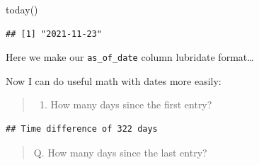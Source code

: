 \documentclass[
]{article}
\newenvironment{Shaded}{\begin{snugshade}}{\end{snugshade}}
\newcommand{\CommentTok}[1]{\textcolor[rgb]{0.56,0.35,0.01}{\textit{#1}}}
\newcommand{\DecValTok}[1]{\textcolor[rgb]{0.00,0.00,0.81}{#1}}
\newcommand{\FunctionTok}[1]{\textcolor[rgb]{0.00,0.00,0.00}{#1}}
\newcommand{\NormalTok}[1]{#1}
\newcommand{\OtherTok}[1]{\textcolor[rgb]{0.56,0.35,0.01}{#1}}
\newcommand{\SpecialCharTok}[1]{\textcolor[rgb]{0.00,0.00,0.00}{#1}}
\providecommand{\tightlist}{%
  \setlength{\itemsep}{0pt}\setlength{\parskip}{0pt}}
\begin{document}
\begin{Shaded}
\begin{Highlighting}[]
\FunctionTok{today}\NormalTok{()}
\end{Highlighting}
\end{Shaded}

\begin{verbatim}
## [1] "2021-11-23"
\end{verbatim}

Here we make our \texttt{as\_of\_date} column lubridate format\ldots{}

\begin{Shaded}
\end{Shaded}

Now I can do useful math with dates more easily:

\begin{quote}
\begin{enumerate}
\def\labelenumi{\Alph{enumi}.}
\setcounter{enumi}{16}
\tightlist
\item
  How many days since the first entry?
\end{enumerate}
\end{quote}

\begin{Shaded}
\end{Shaded}

\begin{verbatim}
## Time difference of 322 days
\end{verbatim}

\begin{quote}
Q. How many days since the last entry?
\end{quote}

\begin{Shaded}
\end{Shaded}
\end{document}
